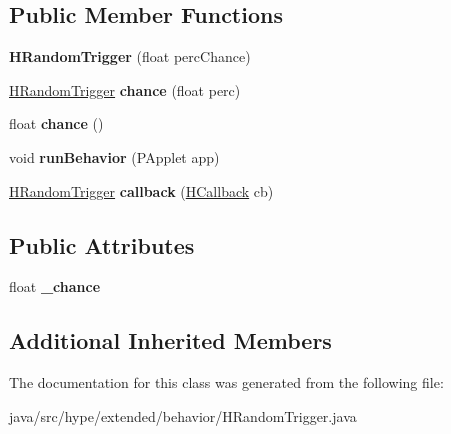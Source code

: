 \subsection*{Public Member Functions}
\begin{DoxyCompactItemize}
\item 
\hypertarget{classhype_1_1extended_1_1behavior_1_1_h_random_trigger_a46372f5839b0bbf5a733b4274f3297de}{{\bfseries H\-Random\-Trigger} (float perc\-Chance)}\label{classhype_1_1extended_1_1behavior_1_1_h_random_trigger_a46372f5839b0bbf5a733b4274f3297de}

\item 
\hypertarget{classhype_1_1extended_1_1behavior_1_1_h_random_trigger_aee186903e7b68d3737de314e3faddeac}{\hyperlink{classhype_1_1extended_1_1behavior_1_1_h_random_trigger}{H\-Random\-Trigger} {\bfseries chance} (float perc)}\label{classhype_1_1extended_1_1behavior_1_1_h_random_trigger_aee186903e7b68d3737de314e3faddeac}

\item 
\hypertarget{classhype_1_1extended_1_1behavior_1_1_h_random_trigger_a9e509fab96e9f0a209975ece715ac38f}{float {\bfseries chance} ()}\label{classhype_1_1extended_1_1behavior_1_1_h_random_trigger_a9e509fab96e9f0a209975ece715ac38f}

\item 
\hypertarget{classhype_1_1extended_1_1behavior_1_1_h_random_trigger_a16eb82e839caef4d885dbf5aca84c0fa}{void {\bfseries run\-Behavior} (P\-Applet app)}\label{classhype_1_1extended_1_1behavior_1_1_h_random_trigger_a16eb82e839caef4d885dbf5aca84c0fa}

\item 
\hypertarget{classhype_1_1extended_1_1behavior_1_1_h_random_trigger_aff77e0d939b9471517428e56a84f3b24}{\hyperlink{classhype_1_1extended_1_1behavior_1_1_h_random_trigger}{H\-Random\-Trigger} {\bfseries callback} (\hyperlink{interfacehype_1_1core_1_1interfaces_1_1_h_callback}{H\-Callback} cb)}\label{classhype_1_1extended_1_1behavior_1_1_h_random_trigger_aff77e0d939b9471517428e56a84f3b24}

\end{DoxyCompactItemize}
\subsection*{Public Attributes}
\begin{DoxyCompactItemize}
\item 
\hypertarget{classhype_1_1extended_1_1behavior_1_1_h_random_trigger_ab856d948362f6d128146168a55581720}{float {\bfseries \-\_\-chance}}\label{classhype_1_1extended_1_1behavior_1_1_h_random_trigger_ab856d948362f6d128146168a55581720}

\end{DoxyCompactItemize}
\subsection*{Additional Inherited Members}


The documentation for this class was generated from the following file\-:\begin{DoxyCompactItemize}
\item 
java/src/hype/extended/behavior/H\-Random\-Trigger.\-java\end{DoxyCompactItemize}

